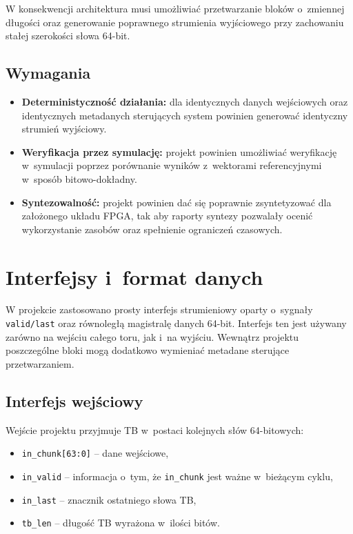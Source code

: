 W konsekwencji architektura musi umożliwiać przetwarzanie bloków o~zmiennej długości oraz generowanie poprawnego strumienia wyjściowego przy zachowaniu stałej szerokości słowa 64-bit.

\subsection{Wymagania}

\begin{itemize}
    \item \textbf{Deterministyczność działania:} dla identycznych danych wejściowych oraz identycznych metadanych sterujących system powinien generować identyczny strumień wyjściowy.
    \item \textbf{Weryfikacja przez symulację:} projekt powinien umożliwiać weryfikację w~symulacji poprzez porównanie wyników z~wektorami referencyjnymi w~sposób bitowo-dokładny.
    \item \textbf{Syntezowalność:} projekt powinien dać się poprawnie zsyntetyzować dla założonego układu FPGA, tak aby raporty syntezy pozwalały ocenić wykorzystanie zasobów oraz spełnienie ograniczeń czasowych.

\end{itemize}


\section{Interfejsy i~format danych}
\label{sec:interfejsy_i_format_danych}

W projekcie zastosowano prosty interfejs strumieniowy oparty o~sygnały \texttt{valid/last} oraz równoległą magistralę danych 64-bit. Interfejs ten jest używany zarówno na wejściu całego toru, jak i~na wyjściu. Wewnątrz projektu poszczególne bloki mogą dodatkowo wymieniać metadane sterujące przetwarzaniem.

\subsection{Interfejs wejściowy}
\label{subsec:interfejs_wej}

Wejście projektu przyjmuje TB w~postaci kolejnych słów 64-bitowych:
\begin{itemize}
    \item \texttt{in\_chunk[63:0]} -- dane wejściowe,
    \item \texttt{in\_valid} -- informacja o~tym, że \texttt{in\_chunk} jest ważne w~bieżącym cyklu,
    \item \texttt{in\_last} -- znacznik ostatniego słowa TB,
    \item \texttt{tb\_len} -- długość TB wyrażona w~ilości bitów.
\end{itemize}

